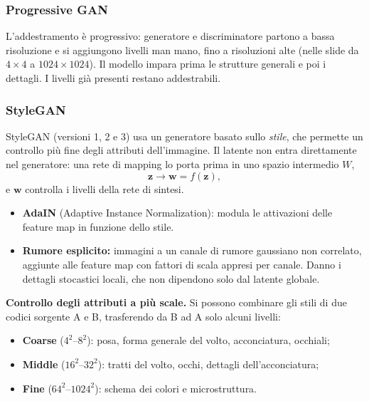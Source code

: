 \documentclass[11pt,a4paper]{article}
\begin{document}
\subsubsection{Progressive GAN}
L'addestramento è progressivo: generatore e discriminatore partono a bassa
risoluzione e si aggiungono livelli man mano, fino a risoluzioni alte (nelle
slide da $4\times4$ a $1024\times1024$). Il modello impara prima le strutture
generali e poi i dettagli. I livelli già presenti restano addestrabili.

\subsubsection{StyleGAN}
StyleGAN (versioni 1, 2 e 3) usa un generatore basato sullo \emph{stile}, che
permette un controllo più fine degli attributi dell'immagine. Il latente non
entra direttamente nel generatore: una rete di mapping lo porta prima in uno
spazio intermedio $W$,
\[
\mathbf{z}\longrightarrow\mathbf{w}=f(\mathbf{z}),
\]
e $\mathbf{w}$ controlla i livelli della rete di sintesi.
\begin{itemize}
  \item \textbf{AdaIN} (Adaptive Instance Normalization): modula le attivazioni
        delle feature map in funzione dello stile.
  \item \textbf{Rumore esplicito:} immagini a un canale di rumore gaussiano non
        correlato, aggiunte alle feature map con fattori di scala appresi per
        canale. Danno i dettagli stocastici locali, che non dipendono solo dal
        latente globale.
\end{itemize}

\textbf{Controllo degli attributi a più scale.} Si possono combinare gli stili
di due codici sorgente A e B, trasferendo da B ad A solo alcuni livelli:
\begin{itemize}
  \item \textbf{Coarse} ($4^2$--$8^2$): posa, forma generale del volto,
        acconciatura, occhiali;
  \item \textbf{Middle} ($16^2$--$32^2$): tratti del volto, occhi, dettagli
        dell'acconciatura;
  \item \textbf{Fine} ($64^2$--$1024^2$): schema dei colori e microstruttura.
\end{itemize}
\end{document}
